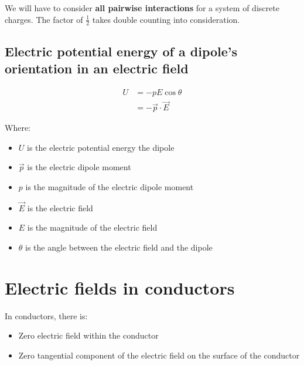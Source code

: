 \documentclass[11pt]{article}
\begin{document}
We will have to consider \textbf{all pairwise interactions} for a system of discrete charges. The factor of \(\frac{1}{2}\) takes double counting into consideration.

\newpage
\subsection{Electric potential energy of a dipole's orientation in an electric field}
\label{sec:orge704620}
\begin{align*}
U &= - p E \cos \theta \\
&= - \vec{p} \cdot \vec{E}
\end{align*}

Where:
\begin{itemize}
\item \(U\) is the electric potential energy the dipole
\item \(\vec{p}\) is the electric dipole moment
\item \(p\) is the magnitude of the electric dipole moment
\item \(\vec{E}\) is the electric field
\item \(E\) is the magnitude of the electric field
\item \(\theta\) is the angle between the electric field and the dipole
\end{itemize}

\newpage
\section{Electric fields in conductors}
\label{sec:org9605d84}
In conductors, there is:
\begin{itemize}
\item Zero electric field within the conductor
\item Zero tangential component of the electric field on the surface of the conductor
\end{itemize}
\end{document}
